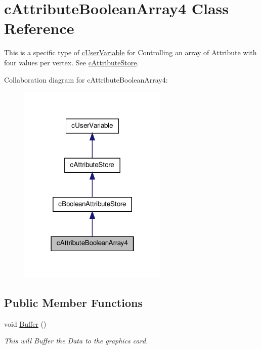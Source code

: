 \hypertarget{classc_attribute_boolean_array4}{
\section{cAttributeBooleanArray4 Class Reference}
\label{classc_attribute_boolean_array4}
}


This is a specific type of \hyperlink{classc_user_variable}{cUserVariable} for Controlling an array of Attribute with four values per vertex. See \hyperlink{classc_attribute_store}{cAttributeStore}.  




Collaboration diagram for cAttributeBooleanArray4:\nopagebreak
\begin{figure}[H]
\begin{center}
\leavevmode
\includegraphics[width=202pt]{classc_attribute_boolean_array4__coll__graph}
\end{center}
\end{figure}
\subsection*{Public Member Functions}
\begin{DoxyCompactItemize}
\item 
\hypertarget{classc_attribute_boolean_array4_a00b56272020a2ca0b4b6e5b8c7b93bf8}{
void \hyperlink{classc_attribute_boolean_array4_a00b56272020a2ca0b4b6e5b8c7b93bf8}{Buffer} ()}
\label{classc_attribute_boolean_array4_a00b56272020a2ca0b4b6e5b8c7b93bf8}

\begin{DoxyCompactList}\small\item\em This will Buffer the Data to the graphics card. \end{DoxyCompactList}\end{DoxyCompactItemize}



